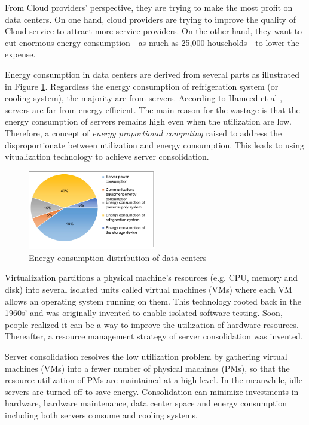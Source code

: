 From Cloud providers' perspective, they are trying to make the most profit on data centers.
On one hand, cloud providers are trying to improve the quality of  Cloud service to attract more service providers.  
On the other hand, they want to cut enormous energy consumption 
- as much as 25,000 households \cite{Kaplan:up01fR-k} - to lower the expense. 

Energy consumption in data centers are derived from several parts as 
illustrated in Figure \ref{fig:consumption}. 
Regardless the energy consumption of refrigeration system (or cooling system), 
the majority are from servers.
According to Hameed et al \cite{Hameed:2016cma}, 
servers are far from energy-efficient. 
The main reason for the wastage is that the energy consumption of servers remains high even when the utilization are low. Therefore, a concept of
\emph{energy proportional computing} \cite{Barroso:2007jt} raised to address the disproportionate between utilization and energy consumption. This leads to 
using vitualization technology to achieve server consolidation.
\begin{figure}
	\centering
	\includegraphics[width=0.5\textwidth]{pics/energyConsumption.png}
	\caption{Energy consumption distribution of data centers \cite{Rong:2016js}}
	\label{fig:consumption}
\end{figure}

Virtualization \cite{Uhlig:2005do} partitions a physical machine's resources (e.g. CPU, memory and disk) into several isolated units called virtual machines (VMs) where each VM allows an operating system running on them. This technology rooted back in the 1960s' and was originally invented to enable isolated software testing. Soon, people realized it can be a way to improve the utilization of hardware resources. Thereafter, a resource management strategy of server consolidation was invented.

Server consolidation \cite{Zhang:2010vo} resolves the low utilization problem by gathering virtual machines (VMs) into a fewer number of physical machines (PMs), so that the resource utilization of PMs are maintained at a high level. In the meanwhile, idle servers are turned off to save energy. Consolidation can minimize investments in hardware, hardware maintenance, data center space and energy consumption including both servers consume and cooling systems.

